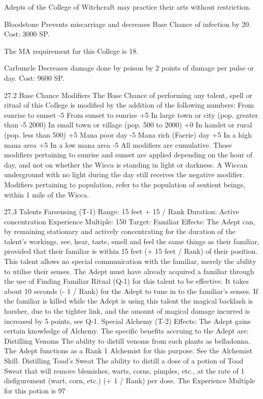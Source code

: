 \documentclass[a4paper]{article}
\begin{document}
\begin{multicols}{3}
Adepts of the College of Witchcraft may practice
their arts without restriction.

Bloodstone Prevents miscarriage and decreases
Base Chance of infection by 20. Cost: 3000 SP.

The MA requirement for this College is 18.

Carbuncle Decreases damage done by poison by 2
points of damage per pulse or day. Cost: 9600 SP.

27.2 Base Chance Modifiers
The Base Chance of performing any talent, spell or
ritual of this College is modified by the addition of
the following numbers:
From sunrise to sunset
-5
From sunset to sunrise
+5
In large town or city (pop. greater than
-5
2000)
In small town or village (pop. 500 to 2000)
+0
In hamlet or rural (pop. less than 500)
+5
Mana poor day
-5
Mana rich (Faerie) day
+5
In a high mana area
+5
In a low mana area
-5
All modifiers are cumulative. Those modifiers
pertaining to sunrise and sunset are applied depending on the hour of day, and not on whether the
Wicca is standing in light or darkness. A Wiccan
underground with no light during the day still
receives the negative modifier. Modifiers pertaining to population, refer to the population of sentient beings, within 1 mile of the Wicca.

27.3 Talents
Farsensing (T-1)
Range: 15 feet + 15 / Rank
Duration: Active concentration
Experience Multiple: 150
Target: Familiar
Effects: The Adept can, by remaining stationary
and actively concentrating for the duration of the
talent’s workings, see, hear, taste, smell and feel
the same things as their familiar, provided that
their familiar is within 15 feet (+ 15 feet / Rank) of
their position. This talent allows no special communication with the familiar, merely the ability to
utilise their senses. The Adept must have already
acquired a familiar through the use of Finding
Familiar Ritual (Q-1) for this talent to be effective.
It takes about 10 seconds (- 1 / Rank) for the Adept
to tune in to the familiar’s senses. If the familiar is
killed while the Adept is using this talent the magical backlash is harsher, due to the tighter link, and
the amount of magical damage incurred is increased by 5 points, see Q-1.
Special Alchemy (T-2)
Effects: The Adept gains certain knowledge of
Alchemy. The specific benefits accruing to the
Adept are:
Distilling Venoms The ability to distill venoms
from such plants as belladonna. The Adept functions as a Rank 1 Alchemist for this purpose. See
the Alchemist Skill.
Distilling Toad’s Sweat The ability to distill a
dose of a potion of Toad Sweat that will remove
blemishes, warts, corns, pimples, etc., at the rate of
1 disfigurement (wart, corn, etc.) (+ 1 / Rank) per
dose. The Experience Multiple for this potion is
97


\end{multicols}
\end{document}
